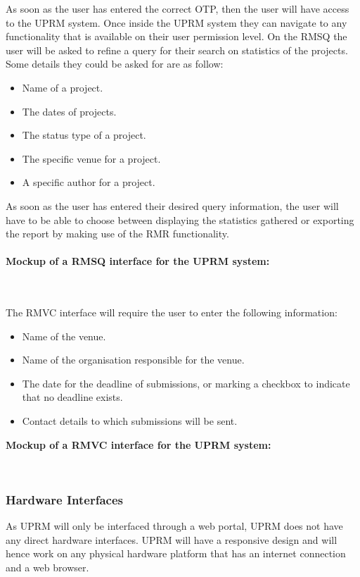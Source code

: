 	As soon as the user has entered the correct OTP, then the user will have access to the UPRM system. Once inside the UPRM system they can navigate to any functionality that is available on their user permission level. On the RMSQ the user will be asked to refine a query for their search on statistics of the projects.\\ Some details they could be asked for are as follow:
	\begin{itemize}
		\item Name of a project.
		\item The dates of projects.
		\item The status type of a project.
		\item The specific venue for a project.
		\item A specific author for a project.
	\end{itemize}
	As soon as the user has entered their desired query information, the user will have to be able to choose between displaying the statistics gathered or exporting the report by making use of the RMR functionality.\\ \\
	\textbf{Mockup of a RMSQ interface for the UPRM system: }\\
	\centerline{}\\ \\
	The RMVC interface will require the user to enter the following information:
	\begin{itemize}
		\item Name of the venue.
		\item Name of the organisation responsible for the venue.
		\item The date for the deadline of submissions, or marking a checkbox to indicate that no deadline exists.
		\item Contact details to which submissions will be sent.\\
	\end{itemize}
	
	\textbf{Mockup of a RMVC interface for the UPRM system: }\\
	\centerline{}\\
	
	
\subsubsection{Hardware Interfaces}
	As UPRM will only be interfaced through a web portal, UPRM does not have any direct hardware interfaces. UPRM will have a responsive design and will hence work on any physical hardware platform that has an internet connection and a web browser.
	
